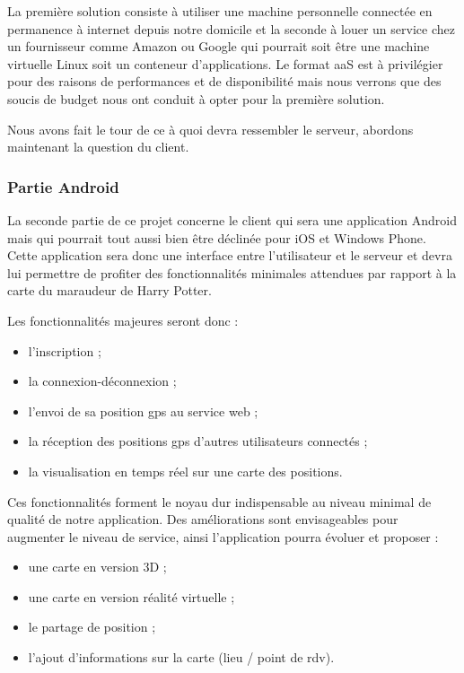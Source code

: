 La première solution consiste à utiliser une machine personnelle connectée en permanence à internet depuis notre domicile et la seconde à louer un service chez un fournisseur comme Amazon ou Google qui pourrait soit être une machine virtuelle Linux soit un conteneur d’applications. Le format aaS est à privilégier pour des raisons de performances et de disponibilité mais nous verrons que des soucis de budget nous ont conduit à opter pour la première solution.

Nous avons fait le tour de ce à quoi devra ressembler le serveur, abordons maintenant la question du client.

\subsubsection{Partie Android}

La seconde partie de ce projet concerne le client qui sera une application Android mais qui pourrait tout aussi bien être déclinée pour iOS et Windows Phone. Cette application sera donc une interface entre l’utilisateur et le serveur et devra lui permettre de profiter des fonctionnalités minimales attendues par rapport à la carte du maraudeur de Harry Potter.

Les fonctionnalités majeures seront donc :

\begin{itemize}
    \item l’inscription ;
    \item la connexion-déconnexion ;
    \item l’envoi de sa position gps au service web ;
    \item la réception des positions gps d'autres utilisateurs connectés ;
    \item la visualisation en temps réel sur une carte des positions.
\end{itemize}

Ces fonctionnalités forment le noyau dur indispensable au niveau minimal de qualité de notre application. Des améliorations sont envisageables pour augmenter le niveau de service, ainsi l'application pourra évoluer et proposer :

\begin{itemize}
    \item une carte en version 3D ;
    \item une carte en version réalité virtuelle ;
    \item le partage de position ;
    \item l'ajout d'informations sur la carte (lieu / point de rdv).
\end{itemize}

